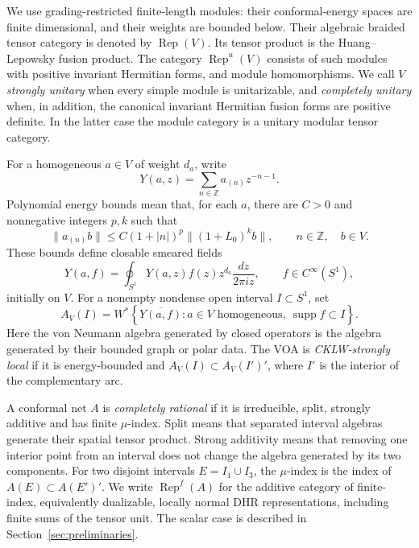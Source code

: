 \documentclass[11pt]{article}
\numberwithin{equation}{section}
\theoremstyle{definition}
\theoremstyle{remark}
\DeclareMathOperator{\Rep}{Rep}
\DeclareMathOperator{\supp}{supp}
\begin{document}
We use grading-restricted finite-length modules: their conformal-energy spaces are finite dimensional, and their weights are bounded below. Their algebraic braided tensor category is denoted by $\Rep(V)$. Its tensor product is the Huang--Lepowsky fusion product. The category $\Rep^u(V)$ consists of such modules with positive invariant Hermitian forms, and module homomorphisms. We call $V$ \emph{strongly unitary} when every simple module is unitarizable, and \emph{completely unitary} when, in addition, the canonical invariant Hermitian fusion forms are positive definite. In the latter case the module category is a unitary modular tensor category.

For a homogeneous $a\in V$ of weight $d_a$, write
\[
 Y(a,z)=\sum_{n\in\mathbb Z}a_{(n)}z^{-n-1}.
\]
Polynomial energy bounds mean that, for each $a$, there are $C>0$ and nonnegative integers $p,k$ such that
\begin{equation}\label{eq:intro-energy}
 \|a_{(n)}b\|\leq C(1+|n|)^p\|(1+L_0)^k b\|,
 \qquad n\in\mathbb Z,\quad b\in V.
\end{equation}
These bounds define closable smeared fields
\begin{equation}\label{eq:intro-smear}
 Y(a,f)=\oint_{S^1}Y(a,z)f(z)z^{d_a}\frac{dz}{2\pi i z},
 \qquad f\in C^\infty(S^1),
\end{equation}
initially on $V$. For a nonempty nondense open interval $I\subset S^1$, set
\begin{equation}\label{eq:intro-net}
 A_V(I)=W^*\!\left\{\overline{Y(a,f)}:
 a\in V\text{ homogeneous},\ \supp f\subset I\right\}.
\end{equation}
Here the von Neumann algebra generated by closed operators is the algebra generated by their bounded graph or polar data. The VOA is \emph{CKLW-strongly local} if it is energy-bounded and $A_V(I)\subset A_V(I')'$, where $I'$ is the interior of the complementary arc.

A conformal net $A$ is \emph{completely rational} if it is irreducible, split, strongly additive and has finite $\mu$-index. Split means that separated interval algebras generate their spatial tensor product. Strong additivity means that removing one interior point from an interval does not change the algebra generated by its two components. For two disjoint intervals $E=I_1\cup I_3$, the $\mu$-index is the index of $A(E)\subset A(E')'$. We write $\Rep^f(A)$ for the additive category of finite-index, equivalently dualizable, locally normal DHR representations, including finite sums of the tensor unit. The scalar case is described in Section~\ref{sec:preliminaries}.
\end{document}

